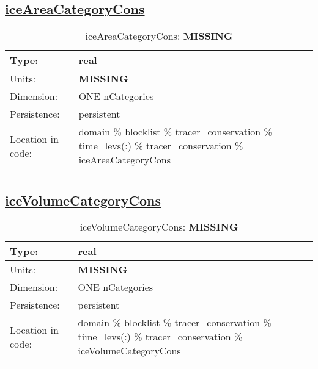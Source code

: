 \subsection[iceAreaCategoryCons]{\hyperref[sec:var_tab_tracer_conservation]{iceAreaCategoryCons}}
\label{subsec:var_sec_tracer_conservation_iceAreaCategoryCons}
\begin{center}
\begin{longtable}{| p{2.0in} | p{4.0in} |}
        \hline 
        Type: & real \\
        \hline 
        Units: & {\bf \color{red} MISSING} \\
        \hline 
        Dimension: & ONE nCategories \\
        \hline 
        Persistence: & persistent \\
        \hline 
         Location in code: & domain \% blocklist \% tracer\_conservation \% time\_levs(:) \% tracer\_conservation \% iceAreaCategoryCons \\
         \hline 
    \caption{iceAreaCategoryCons: {\bf \color{red} MISSING}}
\end{longtable}
\end{center}
\subsection[iceVolumeCategoryCons]{\hyperref[sec:var_tab_tracer_conservation]{iceVolumeCategoryCons}}
\label{subsec:var_sec_tracer_conservation_iceVolumeCategoryCons}
\begin{center}
\begin{longtable}{| p{2.0in} | p{4.0in} |}
        \hline 
        Type: & real \\
        \hline 
        Units: & {\bf \color{red} MISSING} \\
        \hline 
        Dimension: & ONE nCategories \\
        \hline 
        Persistence: & persistent \\
        \hline 
         Location in code: & domain \% blocklist \% tracer\_conservation \% time\_levs(:) \% tracer\_conservation \% iceVolumeCategoryCons \\
         \hline 
    \caption{iceVolumeCategoryCons: {\bf \color{red} MISSING}}
\end{longtable}
\end{center}
